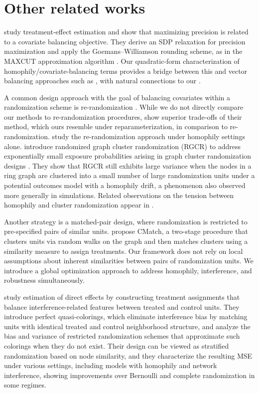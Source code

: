\documentclass[12pt]{article}
\theoremstyle{definition}
\numberwithin{equation}{section}
\numberwithin{figure}{section}
\numberwithin{equation}{section}
\numberwithin{figure}{section}
\begin{document}
\section{Other related works} \label{other_related_work}

\citet{bhat2020near} study treatment-effect estimation and show that maximizing precision is related to a covariate balancing objective. They derive an SDP relaxation for precision maximization and apply the Goemans–Williamson rounding scheme, as in the MAXCUT approximation algorithm \citep{goemans1995improved}.
Our quadratic-form characterization of homophily/covariate-balancing terms provides a bridge between this and vector balancing approaches such as \citet{harshaw2024balancing}, with natural connections to our .

A common design approach with the goal of balancing covariates within a randomization scheme is re-randomization \citep{morgan2012rerandomization,li2018asymptotic}. While we do not directly compare our methods to re-randomization procedures, \citet{harshaw2024balancing} show superior trade-offs of their method, which ours resemble under reparameterization, in comparison to re-randomization. \citet{basse2018model} study the re-randomization approach under homophily settings alone. \citet{ugander2023randomized} introduce randomized graph cluster randomization (RGCR) to address exponentially small exposure probabilities arising in graph cluster randomization designs \citep{ugander2013graph}. They show that RGCR still exhibits large variance when the nodes in a ring graph are clustered into a small number of large randomization units under a potential outcomes model with a homophily drift, a phenomenon also observed more generally in simulations.
Related observations on the tension between homophily and cluster randomization appear in \citet{ugander2012network, cortez2024analysis}.

Another strategy is a matched-pair design, where randomization is restricted to pre-specified pairs of similar units. \citet{fatemi2020minimizing} propose CMatch, a two-stage procedure that clusters units via random walks on the graph and then matches clusters using a similarity measure to assign treatments. Our framework does not rely on local assumptions about inherent similarities between pairs of randomization units. We introduce a global optimization approach to address homophily, interference, and robustness simultaneously.

\citet{jagadeesan2020designs} study estimation of direct effects by constructing treatment assignments that balance interference-related features between treated and control units. They introduce perfect quasi-colorings, which eliminate interference bias by matching units with identical treated and control neighborhood structure, and analyze the bias and variance of restricted randomization schemes that approximate such colorings when they do not exist. Their design can be viewed as stratified randomization based on node similarity, and they characterize the resulting MSE under various settings, including models with homophily and network interference, showing improvements over Bernoulli and complete randomization in some regimes. 
\end{document}
